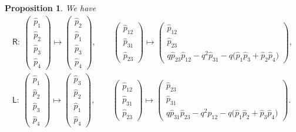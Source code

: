 \documentclass[pdftex]{sigma}
\numberwithin{equation}{section}
\newtheorem{Proposition}[Theorem]{Proposition}
 { \theoremstyle{definition}
\newtheorem{Definition}[Theorem]{Definition}
\newtheorem{Note}[Theorem]{Note}
\newtheorem{Example}[Theorem]{Example}
\newtheorem{Remark}[Theorem]{Remark} }
\begin{document}
\begin{Proposition} We have
 \begin{gather}
 \mathsf{R}\colon \
 \left( \begin{matrix}
 \hat{p}_1 \\
 \hat{p}_2 \\
 \hat{p}_3 \\
 \hat{p}_4
 \end{matrix} \right)
 \mapsto
 \left( \begin{matrix}
 \hat{p}_2 \\
 \hat{p}_1 \\
 \hat{p}_3 \\
 \hat{p}_4
 \end{matrix}
 \right), \qquad
 \left( \begin{matrix}
 \hat{p}_{12} \\
 \hat{p}_{31} \\
 \hat{p}_{23}
 \end{matrix} \right)
 \mapsto
 \left( \begin{matrix}
 \hat{p}_{12} \\
 \hat{p}_{23} \\
 q \hat{p}_{23} \hat{p}_{12} - q^2 \hat{p}_{31} - q \big( \hat{p}_1 \hat{p}_3 + \hat{p}_2 \hat{p}_4 \big)
 \end{matrix} \right) , \nonumber\\
 \mathsf{L}\colon \
 \left( \begin{matrix}
 \hat{p}_1 \\
 \hat{p}_2 \\
 \hat{p}_3 \\
 \hat{p}_4
 \end{matrix} \right)
 \mapsto
 \left( \begin{matrix}
 \hat{p}_3 \\
 \hat{p}_2 \\
 \hat{p}_1 \\
 \hat{p}_4
 \end{matrix} \right) ,
 \qquad
 \left( \begin{matrix}
 \hat{p}_{12} \\
 \hat{p}_{31} \\
 \hat{p}_{23}
 \end{matrix} \right)
 \mapsto
 \left( \begin{matrix}
 \hat{p}_{23} \\
 \hat{p}_{31} \\
 q \hat{p}_{31} \hat{p}_{23} - q^2 \hat{p}_{12} - q \big( \hat{p}_1 \hat{p}_2 + \hat{p}_3 \hat{p}_4 \big)
 \end{matrix} \right) . \label{RL_qp}
 \end{gather}
\end{Proposition}
\end{document}
